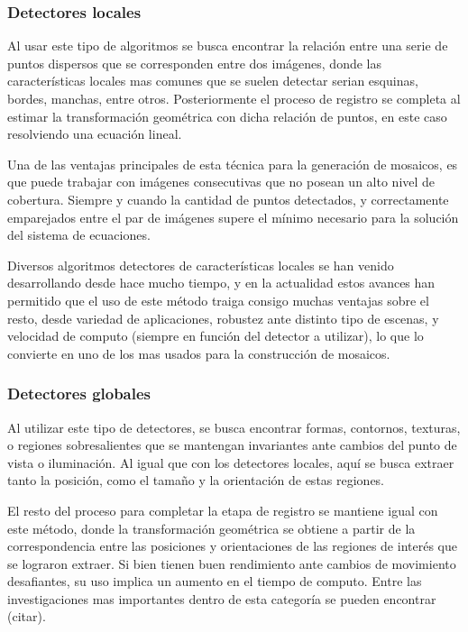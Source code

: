 \subsubsection*{Detectores locales}

Al usar este tipo de algoritmos se busca encontrar la relación entre una serie de puntos dispersos que se corresponden entre dos imágenes, donde las características locales mas comunes que se suelen detectar serian esquinas, bordes, manchas, entre otros. Posteriormente el proceso de registro se completa al estimar la transformación geométrica con dicha relación de puntos, en este caso resolviendo una ecuación lineal.

Una de las ventajas principales de esta técnica para la generación de mosaicos, es que puede trabajar con imágenes consecutivas que no posean un alto nivel de cobertura. Siempre y cuando la cantidad de puntos detectados, y correctamente emparejados entre el par de imágenes supere el mínimo necesario para la solución del sistema de ecuaciones.

Diversos algoritmos detectores de características locales se han venido desarrollando desde hace mucho tiempo, y en la actualidad estos avances han permitido que el uso de este método traiga consigo muchas ventajas sobre el resto, desde variedad de aplicaciones, robustez ante distinto tipo de escenas, y velocidad de computo (siempre en función del detector a utilizar), lo que lo convierte en uno de los mas usados para la construcción de mosaicos.

\subsubsection*{Detectores globales}

Al utilizar este tipo de detectores, se busca encontrar formas, contornos, texturas, o regiones sobresalientes que se mantengan invariantes ante cambios del punto de vista o iluminación. Al igual que con los detectores locales, aquí se busca extraer tanto la posición, como el tamaño y la orientación de estas regiones.

El resto del proceso para completar la etapa de registro se mantiene igual con este método, donde la transformación geométrica se obtiene a partir de la correspondencia entre las posiciones y orientaciones de las regiones de interés que se lograron extraer. Si bien tienen buen rendimiento ante cambios de movimiento desafiantes, su uso implica un aumento en el tiempo de computo. Entre las investigaciones mas importantes dentro de esta categoría se pueden encontrar (citar).

